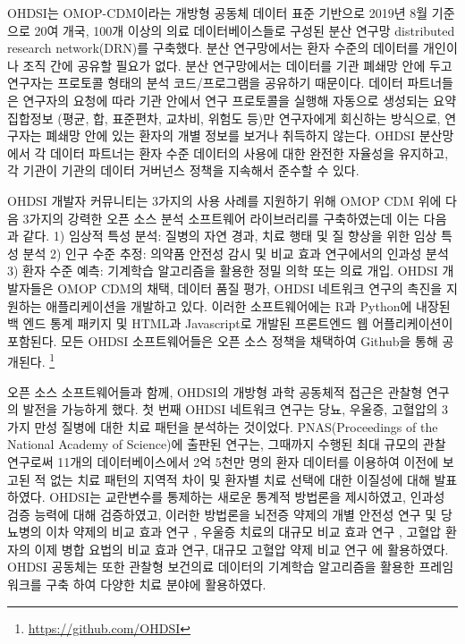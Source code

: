 \documentclass[10.5pt]{book}
\let\rmarkdownfootnote\footnote%
\def\footnote{\protect\rmarkdownfootnote}
\theoremstyle{definition}
\theoremstyle{definition}
\theoremstyle{definition}
\theoremstyle{remark}
\begin{document}
OHDSI는 OMOP-CDM이라는 개방형 공동체 데이터 표준 기반으로 2019년 8월
기준으로 20여 개국, 100개 이상의 의료 데이터베이스들로 구성된 분산
연구망 distributed research network(DRN)를 구축했다. 분산 연구망에서는
환자 수준의 데이터를 개인이나 조직 간에 공유할 필요가 없다. 분산
연구망에서는 데이터를 기관 폐쇄망 안에 두고 연구자는 프로토콜 형태의
분석 코드/프로그램을 공유하기 때문이다. 데이터 파트너들은 연구자의
요청에 따라 기관 안에서 연구 프로토콜을 실행해 자동으로 생성되는 요약
집합정보 (평균, 합, 표준편차, 교차비, 위험도 등)만 연구자에게 회신하는
방식으로, 연구자는 폐쇄망 안에 있는 환자의 개별 정보를 보거나 취득하지
않는다. OHDSI 분산망에서 각 데이터 파트너는 환자 수준 데이터의 사용에
대한 완전한 자율성을 유지하고, 각 기관이 기관의 데이터 거버넌스 정책을
지속해서 준수할 수 있다.

OHDSI 개발자 커뮤니티는 3가지의 사용 사례를 지원하기 위해 OMOP CDM 위에
다음 3가지의 강력한 오픈 소스 분석 소프트웨어 라이브러리를 구축하였는데
이는 다음과 같다. 1) 임상적 특성 분석: 질병의 자연 경과, 치료 행태 및 질
향상을 위한 임상 특성 분석 2) 인구 수준 추정: 의약품 안전성 감시 및 비교
효과 연구에서의 인과성 분석 3) 환자 수준 예측: 기계학습 알고리즘을
활용한 정밀 의학 또는 의료 개입. OHDSI 개발자들은 OMOP CDM의 채택,
데이터 품질 평가, OHDSI 네트워크 연구의 촉진을 지원하는 애플리케이션을
개발하고 있다. 이러한 소프트웨어에는 R과 Python에 내장된 백 엔드 통계
패키지 및 HTML과 Javascript로 개발된 프론트엔드 웹 어플리케이션이
포함된다. 모든 OHDSI 소프트웨어들은 오픈 소스 정책을 채택하여 Github을
통해 공개된다. \footnote{\url{https://github.com/OHDSI}}

오픈 소스 소프트웨어들과 함께, OHDSI의 개방형 과학 공동체적 접근은
관찰형 연구의 발전을 가능하게 했다. 첫 번째 OHDSI 네트워크 연구는 당뇨,
우울증, 고혈압의 3가지 만성 질병에 대한 치료 패턴을 분석하는 것이었다.
PNAS(Proceedings of the National Academy of Science)에 출판된 연구는,
그때까지 수행된 최대 규모의 관찰 연구로써 11개의 데이터베이스에서 2억
5천만 명의 환자 데이터를 이용하여 이전에 보고된 적 없는 치료 패턴의
지역적 차이 및 환자별 치료 선택에 대한 이질성에 대해 발표하였다.
\citep{Hripcsak7329} OHDSI는 교란변수를 통제하는 새로운 통계적 방법론을
제시하였고, \citep{tian_2018} 인과성 검증 능력에 대해 검증하였고,
\citep{schuemie_2018} 이러한 방법론을 뇌전증 약제의 개별 안전성 연구
\citep{duke_2017} 및 당뇨병의 이차 약제의 비교 효과 연구
\citep{vashisht_2018}, 우울증 치료의 대규모 비교 효과 연구
\citep{schuemie_2018b}, 고혈압 환자의 이제 병합 요법의 비교 효과
연구\citep{you_olmesartan_2019}, 대규모 고혈압 약제 비교
연구\citep{suchard_comprehensive_2019} 에 활용하였다. OHDSI 공동체는
또한 관찰형 보건의료 데이터의 기계학습 알고리즘을 활용한 프레임 워크를
구축 \citep{reps2018} 하여 다양한 치료 분야에 활용하였다.
\citep{johnston_2019, cepeda_2018, reps_2019}
\end{document}
